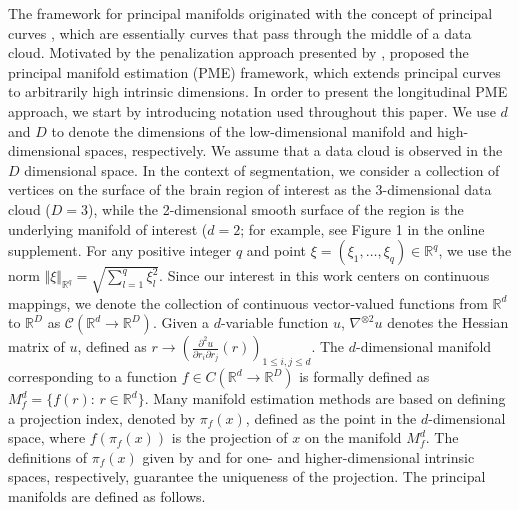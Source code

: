 \documentclass[12pt]{article}
\theoremstyle{definition}
\begin{document}
The framework for principal manifolds originated with the concept of principal curves \citep{hastiePrincipalCurves1989}, which are essentially curves that pass through the middle of a data cloud. Motivated by the penalization approach presented by \cite{smolaRegularizedPrincipalManifolds2001}, \cite{mengPrincipalManifoldEstimation2021} proposed the principal manifold estimation (PME) framework, which extends principal curves to arbitrarily high intrinsic dimensions. In order to present the longitudinal PME approach, we start by introducing notation used throughout this paper. We use $d$ and $D$ to denote the dimensions of the low-dimensional manifold and high-dimensional spaces, respectively. We assume that a data cloud is observed in the $D$ dimensional space. In the context of segmentation, we consider a collection of vertices on the surface of the brain region of interest as the 3-dimensional data cloud ($D=3$), while the 2-dimensional smooth surface of the region is the underlying manifold of interest ($d=2$; for example, see Figure 1 in the online supplement. For any positive integer $q$ and point $\xi=(\xi_1,\ldots,\xi_q)\in\mathbb{R}^q$, we use the norm $\Vert \xi\Vert_{\mathbb{R}^q}=\sqrt{\sum_{l=1}^q \xi_l^2}$. Since our interest in this work centers on continuous mappings, we denote the collection of continuous vector-valued functions from $\mathbb{R}^d$ to $\mathbb{R}^D$ as $\mathcal{C}(\mathbb{R}^{d} \to \mathbb{R}^{D})$. Given a $d$-variable function $u$, $\nabla^{\otimes 2} u$ denotes the Hessian matrix of $u$, defined as $r \to \left( \frac{\partial ^2 u}{\partial r_i \partial r_j}(r) \right)_{1 \leq i, j \leq d}$. The $d$-dimensional manifold corresponding to a function $f \in C(\mathbb{R}^{d} \to \mathbb{R}^{D})$ is formally defined as $M_f^d=\{f(r):\,r\in\mathbb{R}^d\}$. Many manifold estimation methods are based on defining a projection index, denoted by $\pi_f(x)$, defined as the point in the $d$-dimensional space, where $f(\pi_f(x))$ is the projection of $x$ on the manifold $M_f^d$. The definitions of $\pi_f(x)$ given by \cite{hastiePrincipalCurves1989} and \cite{mengPrincipalManifoldEstimation2021} for one- and higher-dimensional intrinsic spaces, respectively, guarantee the uniqueness of the projection. The principal manifolds are defined as follows.
\end{document}

